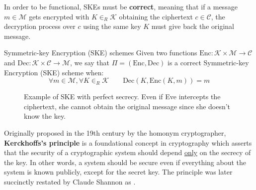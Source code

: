 \documentclass[a4paper, 12pt]{report}
\begin{document}
    In order to be functional, SKEs must be \textbf{correct}, meaning that if a message $m \in \mathcal{M}$ gets encrypted with $K \in_R \mathcal{K}$ obtaining the ciphertext $c \in \mathcal{C}$, the decryption process over $c$ using the same key $K$ must give back the original message.

    \begin{frameddefn}{Symmetric-key Encryption (SKE) schemes}
        Given two functions $\mathrm{Enc} : \mathcal{K} \times \mathcal{M} \to \mathcal{C}$ and $\mathrm{Dec} : \mathcal{K} \times \mathcal{C} \to \mathcal{M}$, we say that $\Pi = (\mathrm{Enc}, \mathrm{Dec})$ is a correct Symmetric-key Encryption (SKE) scheme when:
        \[\forall m \in \mathcal{M}, \forall K \in_R \mathcal{K} \qquad \mathrm{Dec}(K, \mathrm{Enc}(K, m)) = m\]
    \end{frameddefn}

    \begin{figure}[H]
        \centering


        \caption{Example of SKE with perfect secrecy. Even if Eve intercepts the ciphertext, she cannot obtain the original message since she doesn't know the key.}
    \end{figure}

    Originally proposed in the 19th century by the homonym cryptographer, \textbf{Kerckhoffs's principle} is a foundational concept in cryptography which asserts that the security of a cryptographic system should depend \underline{only} on the secrecy of the key. In other words, a system should be secure even if everything about the system is known publicly, except for the secret key. The principle was later succinctly restated by Claude Shannon as .
\end{document}
